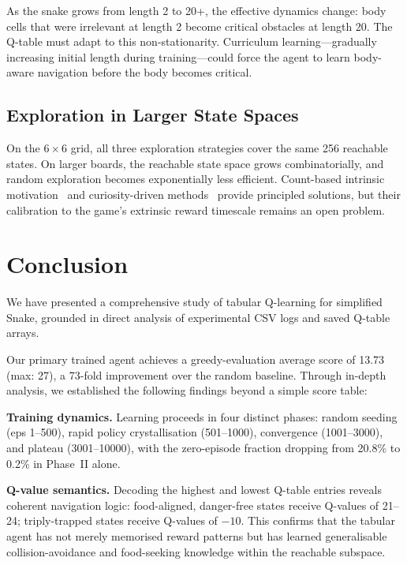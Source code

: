 \documentclass[10pt,conference]{IEEEtran}
\begin{document}
As the snake grows from length 2 to 20+, the effective dynamics change:
body cells that were irrelevant at length 2 become critical obstacles
at length 20.
The Q-table must adapt to this non-stationarity.
Curriculum learning---gradually increasing initial length during
training---could force the agent to learn body-aware navigation
before the body becomes critical.

\subsection{Exploration in Larger State Spaces}

On the $6{\times}6$ grid, all three exploration strategies cover
the same 256 reachable states.
On larger boards, the reachable state space grows combinatorially,
and random exploration becomes exponentially less efficient.
Count-based intrinsic motivation~\cite{bellemare2016unifying} and
curiosity-driven methods~\cite{pathak2017curiosity} provide principled
solutions, but their calibration to the game's extrinsic reward
timescale remains an open problem.

\section{Conclusion}
\label{sec:conclusion}

We have presented a comprehensive study of tabular Q-learning for
simplified Snake, grounded in direct analysis of experimental CSV
logs and saved Q-table arrays.

Our primary trained agent achieves a greedy-evaluation average score
of 13.73 (max: 27), a 73-fold improvement over the random baseline.
Through in-depth analysis, we established the following findings
beyond a simple score table:

\textbf{Training dynamics.}
Learning proceeds in four distinct phases: random seeding (eps 1--500),
rapid policy crystallisation (501--1000), convergence (1001--3000),
and plateau (3001--10000), with the zero-episode fraction dropping
from 20.8\% to 0.2\% in Phase~II alone.

\textbf{Q-value semantics.}
Decoding the highest and lowest Q-table entries reveals coherent
navigation logic: food-aligned, danger-free states receive Q-values
of 21--24; triply-trapped states receive Q-values of $-10$.
This confirms that the tabular agent has not merely memorised
reward patterns but has learned generalisable collision-avoidance
and food-seeking knowledge within the reachable subspace.
\end{document}
